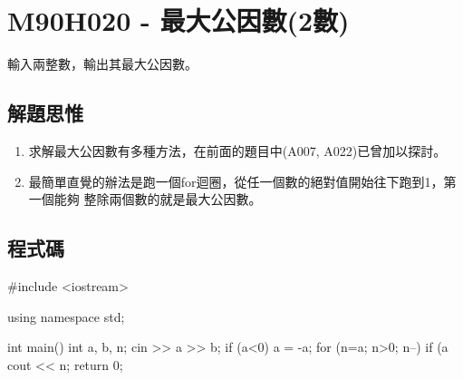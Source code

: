 \section{M90H020 - 最大公因數(2數)}
輸入兩整數，輸出其最大公因數。
\subsection{解題思惟}
\begin{enumerate}
	\item 求解最大公因數有多種方法，在前面的題目中(A007, A022)已曾加以探討。
	\item 最簡單直覺的辦法是跑一個for迴圈，從任一個數的絕對值開始往下跑到1，第一個能夠
	整除兩個數的就是最大公因數。
\end{enumerate}
\subsection{程式碼}
\begin{cppcode}
#include <iostream>

using namespace std;

int main()
{
	int a, b, n;
	cin >> a >> b;
	if (a<0) a = -a;
	for (n=a; n>0; n--) {
		if (a%
	}
	cout << n;
	return 0;
}
\end{cppcode}
